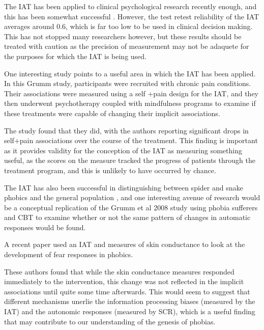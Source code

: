 The IAT has been applied to clinical psychological research recently enough, and this has been somewhat successful \cite{DeHouwer2002}. However, the test retest reliability of the IAT averages around 0.6, which is far too low to be used in clinical decision making. This has not stopped many researchers however, but these results should be treated with caution as the precision of measurement may not be adaquete for the purposes for which the IAT is being used. 

One interesting study \cite{Grumm2008} points to a useful area in which the IAT has been applied. In this Grumm study, participants were recruited with chronic pain conditions. Their associations were measured using a self +pain design for the IAT, and they then underwent psychotherapy coupled with mindfulness programs to examine if these treatments were capable of changing their implicit associations. 

The study found that they did, with the authors reporting significant drops in self+pain associations over the course of the treatment. This finding is important as it provides validity for the conception of the IAT as measuring something useful, as the scores on the measure tracked the progress of patients through the treatment program, and this is unlikely to have occurred by chance.  

 The IAT has also been successful in distinguishing between spider and snake phobics and the general population \cite{Egloff2002,Lane2007}, and one interesting avenue of research would be a conceptual replication of the Grumm et al 2008 study using phobia sufferers and CBT to examine whether or not the same pattern of changes in automatic responses would be found. 


A recent paper \cite{Boschen2007} used an IAT and measures of skin conductance to look at the development of fear responses in phobics. 

These authors found that while the skin conductance measures responded immediately to the intervention, this change was not reflected in the implicit associations until quite some time afterwards. This would seem to suggest that different mechanisms unerlie the information processing biases (measured by the IAT) and the autonomic responses (measured by SCR), which is a useful finding that may contribute to our understanding of the genesis of phobias. 



